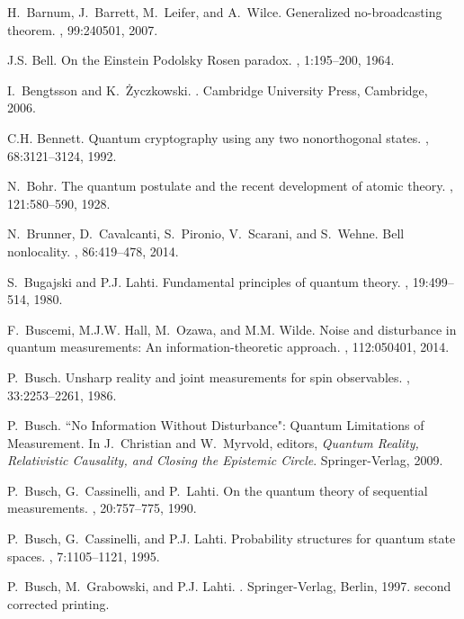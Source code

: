 \documentclass[12pt]{article}
\theoremstyle{definition}
\begin{document}
{\begin{thebibliography}{10}
H.~Barnum, J.~Barrett, M.~Leifer, and A.~Wilce.
\newblock Generalized no-broadcasting theorem.
, 99:240501, 2007.

J.S. Bell.
\newblock On the {E}instein {P}odolsky {R}osen paradox.
, 1:195--200, 1964.

I.~Bengtsson and K.~{\.Z}yczkowski.
.
\newblock Cambridge University Press, Cambridge, 2006.

C.H. Bennett.
\newblock Quantum cryptography using any two nonorthogonal states.
, 68:3121--3124, 1992.

N.~Bohr.
\newblock The quantum postulate and the recent development of atomic theory.
, 121:580--590, 1928.

N.~Brunner, D.~Cavalcanti, S.~Pironio, V.~Scarani, and S.~Wehne.
\newblock Bell nonlocality.
, 86:419--478, 2014.

S.~Bugajski and P.J. Lahti.
\newblock Fundamental principles of quantum theory.
, 19:499--514, 1980.

F.~Buscemi, M.J.W. Hall, M.~Ozawa, and M.M. Wilde.
\newblock Noise and disturbance in quantum measurements: An
  information-theoretic approach.
, 112:050401, 2014.

P.~Busch.
\newblock Unsharp reality and joint measurements for spin observables.
, 33:2253--2261, 1986.

P.~Busch.
\newblock ``{N}o {I}nformation {Wi}thout {D}isturbance": {Q}uantum
  {L}imitations of {M}easurement.
\newblock In J.~Christian and W.~Myrvold, editors, {\em {Q}uantum {R}eality,
  {R}elativistic {C}ausality, and {C}losing the {E}pistemic {C}ircle}.
  Springer-Verlag, 2009.

P.~Busch, G.~Cassinelli, and P.~Lahti.
\newblock On the quantum theory of sequential measurements.
, 20:757--775, 1990.

P.~Busch, G.~Cassinelli, and P.J. Lahti.
\newblock Probability structures for quantum state spaces.
, 7:1105--1121, 1995.

P.~Busch, M.~Grabowski, and P.J. Lahti.
.
\newblock Springer-Verlag, Berlin, 1997.
\newblock second corrected printing.


\end{thebibliography}}
\end{document}
